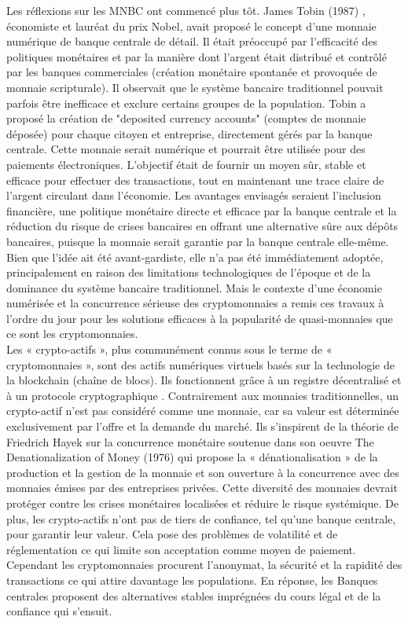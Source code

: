 \documentclass[12pt]{article}
\begin{document}
Les réflexions sur les MNBC ont commencé plus tôt. James Tobin (1987) \cite{013f4a37-bc65-3840-b210-0ecaf970d07c}, économiste et lauréat du prix Nobel, avait proposé  le concept d'une monnaie numérique de banque centrale de détail. Il était préoccupé par l'efficacité des politiques monétaires et par la manière dont l'argent était distribué et contrôlé par les banques commerciales (création monétaire spontanée et provoquée de monnaie scripturale). Il observait que le système bancaire traditionnel pouvait parfois être inefficace et exclure certains groupes de la population. Tobin a proposé la création de "deposited currency accounts" (comptes de monnaie déposée) pour chaque citoyen et entreprise, directement gérés par la banque centrale. Cette monnaie serait numérique et pourrait être utilisée pour des paiements électroniques. L'objectif était de fournir un moyen sûr, stable et efficace pour effectuer des transactions, tout en maintenant une trace claire de l'argent circulant dans l’économie. Les avantages envisagés seraient l’inclusion financière, une politique monétaire directe et efficace par la banque centrale et la réduction du risque de crises bancaires en offrant une alternative sûre aux dépôts bancaires, puisque la monnaie serait garantie par la banque centrale elle-même. Bien que l'idée ait été avant-gardiste, elle n'a pas été immédiatement adoptée, principalement en raison des limitations technologiques de l'époque et de la dominance du système bancaire traditionnel. Mais le contexte d’une économie numérisée et la concurrence sérieuse des cryptomonnaies a remis ces travaux à l’ordre du jour pour les solutions efficaces à la popularité de quasi-monnaies que ce sont les cryptomonnaies.\\

Les « crypto-actifs », plus communément connus sous le terme de « cryptomonnaies », sont des actifs numériques virtuels basés sur la technologie de la blockchain (chaîne de blocs). Ils fonctionnent grâce à un registre décentralisé et à un protocole cryptographique . Contrairement aux monnaies traditionnelles, un crypto-actif n’est pas considéré comme une monnaie, car sa valeur est déterminée exclusivement par l’offre et la demande du marché. Ils s’inspirent de la théorie de Friedrich Hayek sur la concurrence monétaire soutenue dans son oeuvre The Denationalization of Money (1976) \cite{RePEc:eee:moneco:v:3:y:1977:i:4:p:483-485} qui propose la « dénationalisation » de la production et la gestion de la monnaie et son ouverture à la concurrence avec des monnaies émises par des entreprises privées. Cette diversité des monnaies devrait protéger contre les crises monétaires localisées et réduire le risque systémique. De plus, les crypto-actifs n’ont pas de tiers de confiance, tel qu’une banque centrale, pour garantir leur valeur. Cela pose des problèmes de volatilité et de réglementation ce qui limite son acceptation comme moyen de paiement. Cependant les cryptomonnaies procurent l’anonymat, la sécurité et la rapidité des transactions ce qui attire davantage les populations. En réponse, les Banques centrales proposent des alternatives stables imprégnées du cours légal et de la confiance qui s'ensuit. \\
\end{document}
